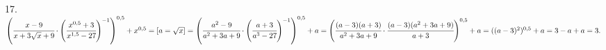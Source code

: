 17. $\left(\cfrac{x-9}{x+3\sqrt{x}+9}\cdot\left(\cfrac{x^{0,5}+3}{x^{1,5}-27}\right)^{-1}\right)^{0,5}+x^{0,5}=[a=\sqrt{x}]=
\left(\cfrac{a^2-9}{a^2+3a+9}\cdot\left(\cfrac{a+3}{a^3-27}\right)^{-1}\right)^{0,5}+a=
\left(\cfrac{(a-3)(a+3)}{a^2+3a+9}\cdot\cfrac{(a-3)(a^2+3a+9)}{a+3}\right)^{0,5}+a=((a-3)^2)^{0,5}+a=3-a+a=3.$\\
